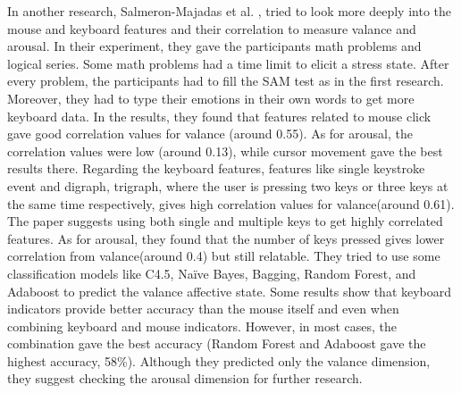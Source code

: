 \documentclass[../main.tex]{subfiles}
\begin{document}
In another research, Salmeron-Majadas et al. \cite{An_Evaluation_Of_Mouse_And_Keyboard_Interaction}, tried to look more 
deeply into the mouse and keyboard features and their correlation to measure valance and arousal. 
In their experiment, they gave the participants math problems and logical series. 
Some math problems had a time limit to elicit a stress state. 
After every problem, the participants had to fill the SAM test as in the first research. 
Moreover, they had to type their emotions in their own words to get more keyboard data. 
In the results, they found that features related to mouse click gave good correlation values 
for valance (around 0.55). As for arousal, the correlation values were low (around 0.13), 
while cursor movement gave the best results there. Regarding the keyboard features, 
features like single keystroke event and digraph, trigraph, where the user is pressing two keys or 
three keys at the same time respectively, gives high correlation values for valance(around 0.61). 
The paper suggests using both single and multiple keys to get highly correlated features. 
As for arousal, they found that the number of keys pressed gives lower correlation from 
valance(around 0.4) but still relatable. They tried to use some classification models like C4.5, 
Naïve Bayes, Bagging, Random Forest, and Adaboost to predict the valance affective state. 
Some results show that keyboard indicators provide better accuracy than the mouse itself and even 
when combining keyboard and mouse indicators. However, in most cases, the combination gave the best 
accuracy (Random Forest and Adaboost gave the highest accuracy, 58\%). 
Although they predicted only the valance dimension, they suggest checking the arousal 
dimension for further research.
\par
\end{document}
